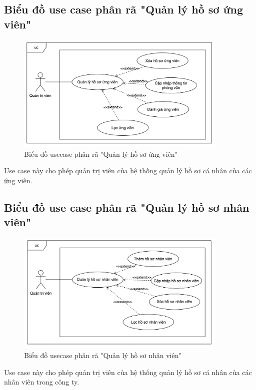 \documentclass[../DoAn.tex]{subfiles}
\begin{document}
\subsection{Biểu đồ use case phân rã "Quản lý hồ sơ ứng viên"}
\label{subsection:2.2.3}
\begin{figure}[H]
    \centering
    \includegraphics[width=0.9\textwidth]{Hinhve/UC_QuanLyHoSoUngVien.png}
    \caption{Biểu đồ usecase phân rã "Quản lý hồ sơ ứng viên"}
\end{figure}
Use case này cho phép quản trị viên của hệ thống quản lý hồ sơ cá nhân của các ứng viên.

\subsection{Biểu đồ use case phân rã "Quản lý hồ sơ nhân viên"}
\label{subsection:2.2.4}
\begin{figure}[H]
    \centering
    \includegraphics[width=0.9\textwidth]{Hinhve/UC_QuanLyHoSoNhanVien.png}
    \caption{Biểu đồ usecase phân rã "Quản lý hồ sơ nhân viên"}
\end{figure}
Use case này cho phép quản trị viên của hệ thống quản lý hồ sơ cá nhân của các nhân viên trong công ty.
\end{document}
